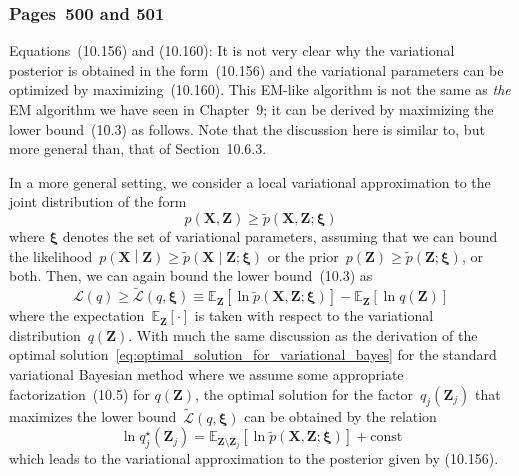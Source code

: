 \documentclass[12pt,a4paper]{article}
\newcommand{\erratum}[1]{%
\subsubsection*{#1}
\addcontentsline{toc}{subsection}{#1}}
\begin{document}
\erratum{Pages~500 and 501}
Equations~(10.156) and (10.160):
It is not very clear why the variational posterior is obtained in the form~(10.156) and
the variational parameters can be optimized by maximizing~(10.160).
This EM-like algorithm is not the same as \emph{the} EM algorithm we have seen in Chapter~9;
it can be derived by maximizing the lower bound~(10.3) as follows.
Note that the discussion here is similar to, but more general than, that of Section~10.6.3.

In a more general setting, we consider a local variational approximation to
the joint distribution of the form
\begin{equation}
p\left(\mathbf{X}, \mathbf{Z}\right) \geqslant
\widetilde{p}\left(\mathbf{X}, \mathbf{Z}; \bm{\xi} \right)
\end{equation}
where $\bm{\xi}$ denotes the set of variational parameters,
assuming that we can bound the likelihood~$p\left(\mathbf{X} \middle| \mathbf{Z}\right) \geqslant
\widetilde{p}\left(\mathbf{X} \middle| \mathbf{Z}; \bm{\xi} \right)$
or the prior~$p\left(\mathbf{Z}\right) \geqslant
\widetilde{p}\left(\mathbf{Z}; \bm{\xi} \right)$, or both.
Then, we can again bound the lower bound~(10.3) as
\begin{equation}
\mathcal{L}(q) \geqslant 
\widetilde{\mathcal{L}}(q, \bm{\xi}) \equiv
\mathbb{E}_{\mathbf{Z}}\left[\ln \widetilde{p}\left(\mathbf{X}, \mathbf{Z}; \bm{\xi}\right)\right]
- \mathbb{E}_{\mathbf{Z}}\left[\ln q\left(\mathbf{Z}\right)\right]
\label{eq:bound_of_lower_bound}
\end{equation}
where the expectation~$\mathbb{E}_{\mathbf{Z}}[\cdot]$ is taken with respect to
the variational distribution~$q(\mathbf{Z})$.
With much the same discussion as the derivation of
the optimal solution~\eqref{eq:optimal_solution_for_variational_bayes}
for the standard variational Bayesian method
where we assume some appropriate factorization~(10.5) for $q(\mathbf{Z})$,
the optimal solution for the factor~$q_j(\mathbf{Z}_j)$ that maximizes
the lower bound~$\widetilde{\mathcal{L}}(q, \bm{\xi})$ can be obtained by the relation
\begin{equation}
\ln q_j^{\star}\left(\mathbf{Z}_j\right) =
\mathbb{E}_{\mathbf{Z}\setminus\mathbf{Z}_j}
\left[ \ln \widetilde{p}\left(\mathbf{X}, \mathbf{Z}; \bm{\xi}\right) \right] +
\text{const}
\label{eq:optimal_solution_for_local_variational_bayes}
\end{equation}
which leads to the variational approximation to the posterior given by (10.156).
\end{document}
